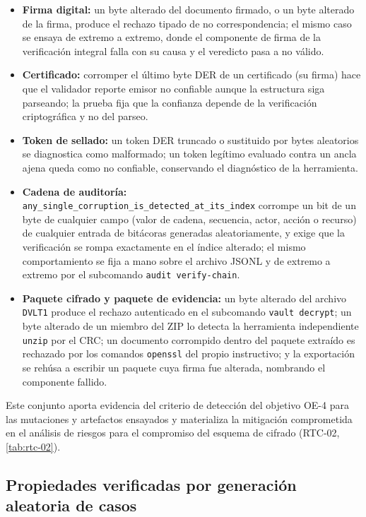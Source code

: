 \begin{itemize}
  \item \textbf{Firma digital:} un byte alterado del documento firmado, o un byte alterado de la firma, produce el rechazo tipado de no correspondencia; el mismo caso se ensaya de extremo a extremo, donde el componente de firma de la verificación integral falla con su causa y el veredicto pasa a no válido.
  \item \textbf{Certificado:} corromper el último byte DER de un certificado (su firma) hace que el validador reporte emisor no confiable aunque la estructura siga parseando; la prueba fija que la confianza depende de la verificación criptográfica y no del parseo.
  \item \textbf{Token de sellado:} un token DER truncado o sustituido por bytes aleatorios se diagnostica como malformado; un token legítimo evaluado contra un ancla ajena queda como no confiable, conservando el diagnóstico de la herramienta.
  \item \textbf{Cadena de auditoría:} \texttt{any\_single\_corruption\_is\_detected\_at\_its\_index} corrompe un bit de un byte de cualquier campo (valor de cadena, secuencia, actor, acción o recurso) de cualquier entrada de bitácoras generadas aleatoriamente, y exige que la verificación se rompa exactamente en el índice alterado; el mismo comportamiento se fija a mano sobre el archivo JSONL y de extremo a extremo por el subcomando \texttt{audit verify-chain}.
  \item \textbf{Paquete cifrado y paquete de evidencia:} un byte alterado del archivo \texttt{DVLT1} produce el rechazo autenticado en el subcomando \texttt{vault decrypt}; un byte alterado de un miembro del ZIP lo detecta la herramienta independiente \texttt{unzip} por el CRC; un documento corrompido dentro del paquete extraído es rechazado por los comandos \texttt{openssl} del propio instructivo; y la exportación se rehúsa a escribir un paquete cuya firma fue alterada, nombrando el componente fallido.
\end{itemize}

Este conjunto aporta evidencia del criterio de detección del objetivo OE-4 para las mutaciones y artefactos ensayados y materializa la mitigación comprometida en el análisis de riesgos para el compromiso del esquema de cifrado (RTC-02, \cref{tab:rtc-02}).

\subsection{Propiedades verificadas por generación aleatoria de casos}\label{sec:pruebas-propiedades}

